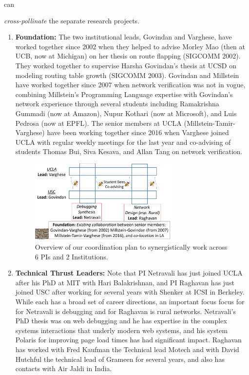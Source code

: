 \documentclass[10pt]{article}
\begin{document}
can {\emph{cross-pollinate} the separate research projects.

\begin{enumerate}
\item \textbf{Foundation:} The two institutional leads, Govindan and Varghese, have worked
together since 2002 when they helped to advise Morley Mao (then at UCB, now at Michigan) on
her thesis on route flapping (SIGCOMM 2002).  They worked together to supervise Harsha Govindan's thesis at UCSD on modeling routing table growth (SIGCOMM 2003).  Govindan and
Millstein have worked together since 2007 when network verification was not in vogue, combining
Millstein's Programming Language expertise with Govindan's network experience through several
students including Ramakrishna Gummadi (now at Amazon), Nupur Kothari (now at Microsoft),
and Luis Pedrosa (now at EPFL).  The senior members at UCLA (Millstein-Tamir-Varghese) have been working together since 2016 when Varghese joined UCLA with regular weekly meetings for
the last year and co-advising of students Thomas Bui, Siva Kesava, and Allan Tang on network
verification.

\begin{figure}[htb]
\centering
\includegraphics[width=0.7\textwidth]{coordinationplan.pdf}
\caption{Overview of our coordination plan to synergistically work across 6 PIs and 2 Institutions.}
\label{fig:overview}
\end{figure}

\item \textbf{Technical Thrust Leaders:} Note that PI Netravali has just joined UCLA after his PhD at MIT with Hari Balakrishnan, and PI Raghavan has just joined USC after working for several
years with Shenker at ICSI in Berkeley. While each has a broad set of career directions, an important focus  focus for for Netravali is debugging and for Raghavan is rural networks. Netravali's PhD thesis was on web debugging and he has expertise in the complex systems interactions that
underly modern web systems, and his system Polaris for improving page load times has had
significant impact.  Raghavan has worked with Fred Kaufman the Technical lead
Motech and with David Hutchful the technical lead of Grameen for several years, and also
has contacts with Air Jaldi in India.


\end{enumerate}}
\end{document}
